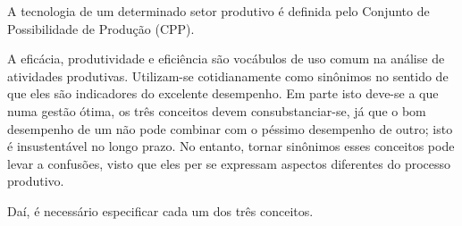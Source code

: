 A tecnologia de um determinado setor produtivo é definida pelo Conjunto de Possibilidade de Produção (CPP).

A eficácia, produtividade e eficiência são vocábulos de uso comum na análise de atividades produtivas. 
Utilizam-se cotidianamente como sinônimos no sentido de que eles são indicadores do excelente desempenho. 
Em parte isto deve-se a que numa gestão ótima, os três conceitos devem consubstanciar-se, já que o bom desempenho de um não pode combinar com o péssimo desempenho de outro; isto é insustentável no longo prazo. 
No entanto, tornar sinônimos esses conceitos pode levar a confusões, visto que eles per se expressam aspectos diferentes do processo produtivo.

Daí, é necessário especificar cada um dos três conceitos.
